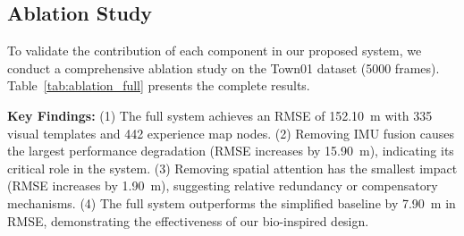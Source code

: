 
\subsection{Ablation Study}

To validate the contribution of each component in our proposed system, we conduct a comprehensive ablation study on the Town01 dataset (5000 frames). Table~\ref{tab:ablation_full} presents the complete results.

\textbf{Key Findings:} (1) The full system achieves an RMSE of 152.10~m with 335 visual templates and 442 experience map nodes. (2) Removing IMU fusion causes the largest performance degradation (RMSE increases by 15.90~m), indicating its critical role in the system. (3) Removing spatial attention has the smallest impact (RMSE increases by 1.90~m), suggesting relative redundancy or compensatory mechanisms. (4) The full system outperforms the simplified baseline by 7.90~m in RMSE, demonstrating the effectiveness of our bio-inspired design.

